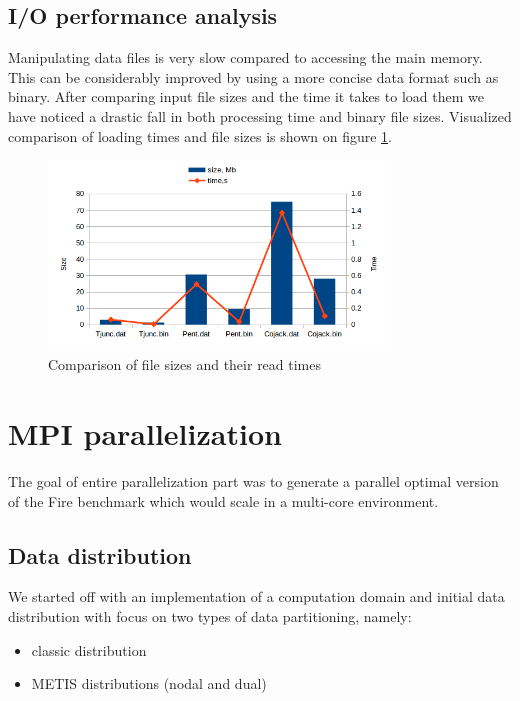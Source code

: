 \documentclass{article}
\begin{document}
\subsection{I/O performance analysis}
Manipulating data files is very slow compared to accessing the main memory. This can be considerably improved by using a more concise data format such as binary. After comparing input file sizes and the time it takes to load them we have noticed a drastic fall in both processing time and binary file sizes. Visualized comparison of loading times and file sizes is shown on figure \ref{fig:3}.

\begin{figure}[h!]
	\begin{center}
		\includegraphics[width=0.8\textwidth]{time-size}
		\caption{Comparison of file sizes and their read times}
		\label{fig:3}
	\end{center}
\end{figure}
\section{MPI parallelization}
The goal of entire parallelization part was to generate a parallel optimal version of the Fire benchmark which would scale in a multi-core environment.

\subsection{Data distribution}
We started off with an implementation of a computation domain and initial data distribution with focus on two types of data partitioning, namely:
\begin{itemize}
	\item classic distribution
	\item METIS distributions (nodal and dual)
\end{itemize}
\end{document}
